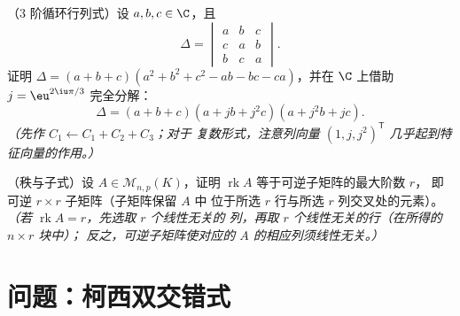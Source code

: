 \begin{exercise}[$\star\star$]\label{exo:b1:det:11}
（$3$ 阶循环行列式）设 $a, b, c \in \C$，且
\[
\Delta = \begin{vmatrix}
a & b & c\\
c & a & b\\
b & c & a
\end{vmatrix}.
\]
证明 $\Delta = (a + b + c)(a^2 + b^2 + c^2 - ab - bc -
ca)$，并在 $\C$ 上借助 $j =
\eu^{2\iu\pi/3}$ 完全分解：
\[
\Delta = (a + b + c)(a + jb + j^2c)(a + j^2b + jc) .
\]
\emph{（先作 $C_1 \leftarrow C_1 + C_2 + C_3$；对于
复数形式，注意列向量 $(1, j, j^2)^{\mathsf T}$
几乎起到特征向量的作用。）}
\end{exercise}

\begin{exercise}[$\star\star\star$]\label{exo:b1:det:12}
（秩与子式）设 $A \in \mathcal{M}_{n,p}(K)$，证明
$\operatorname{rk} A$ 等于可逆子矩阵的最大阶数 $r$，
即可逆 $r \times r$ 子矩阵（子矩阵保留 $A$ 中
位于所选 $r$ 行与所选 $r$
列交叉处的元素）。\emph{（若 $\operatorname{rk} A = r$，先选取 $r$ 个线性无关的
列，再取 $r$ 个线性无关的行（在所得的 $n \times r$ 块中）；
反之，可逆子矩阵使对应的
$A$ 的相应列须线性无关。）}
\end{exercise}

\section{问题：柯西双交错式}

